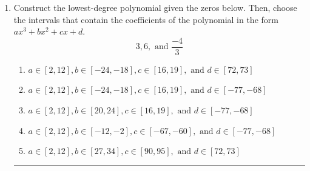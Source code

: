 \documentclass[14pt]{extbook}
\newcommand{\litem}[1]{\item#1\hspace*{-1cm}\rule{\textwidth}{0.4pt}}
\begin{document}
\begin{enumerate}
{\begin{enumerate}[label=\Alph*.]
\end{enumerate} }
\litem{
Construct the lowest-degree polynomial given the zeros below. Then, choose the intervals that contain the coefficients of the polynomial in the form $ax^3+bx^2+cx+d$.\[ 3, 6, \text{ and } \frac{-4}{3} \]\begin{enumerate}[label=\Alph*.]
\item \( a \in [2, 12], b \in [-24, -18], c \in [16, 19], \text{ and } d \in [72, 73] \)
\item \( a \in [2, 12], b \in [-24, -18], c \in [16, 19], \text{ and } d \in [-77, -68] \)
\item \( a \in [2, 12], b \in [20, 24], c \in [16, 19], \text{ and } d \in [-77, -68] \)
\item \( a \in [2, 12], b \in [-12, -2], c \in [-67, -60], \text{ and } d \in [-77, -68] \)
\item \( a \in [2, 12], b \in [27, 34], c \in [90, 95], \text{ and } d \in [72, 73] \)

\end{enumerate} }
\end{enumerate}
\end{document}
